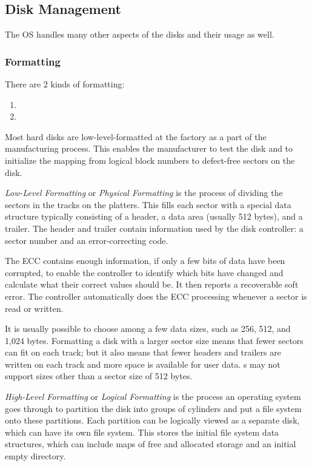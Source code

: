 \subsection{Disk Management}\label{subsec:Disk_Management}
The OS handles many other aspects of the disks and their usage as well.

\subsubsection{Formatting}\label{subsubsec:Formatting}
There are 2 kinds of formatting:
\begin{enumerate}[noitemsep]
\item {}
\item {}
\end{enumerate}

Most hard disks are low-level-formatted at the factory as a part of the manufacturing process.
This enables the manufacturer to test the disk and to initialize the mapping from logical block numbers to defect-free sectors on the disk.

\begin{definition}\label{def:Low_Level_Formatting}
  \emph{Low-Level Formatting} or \emph{Physical Formatting} is the process of dividing the sectors in the tracks on the platters.
  This fills each sector with a special data structure typically consisting of a header, a data area (usually 512 bytes), and a trailer.
  The header and trailer contain information used by the disk controller: a sector number and an error-correcting code.
\end{definition}

The ECC contains enough information, if only a few bits of data have been corrupted, to enable the controller to identify which bits have changed and calculate what their correct values should be.
It then reports a recoverable soft error.
The controller automatically does the ECC processing whenever a sector is read or written.

It is usually possible to choose among a few data sizes, such as 256, 512, and 1,024 bytes.
Formatting a disk with a larger sector size means that fewer sectors can fit on each track; but it also means that fewer headers and trailers are written on each track and more space is available for user data.
s may not support sizes other than a sector size of 512 bytes.

\begin{definition}\label{def:High_Level_Formatting}
  \emph{High-Level Formatting} or \emph{Logical Formatting} is the process an operating system goes through to partition the disk into groups of cylinders and put a file system onto these partitions.
  Each partition can be logically viewed as a separate disk, which can have its own file system.
  This stores the initial file system data structures, which can include maps of free and allocated storage and an initial empty directory.
\end{definition}

